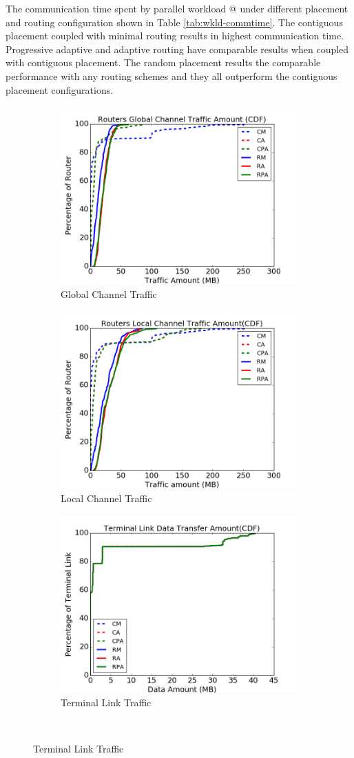 \documentclass[conference,compsoc]{IEEEtran}
\makeatletter
\newcommand{\Rmnum}[1]{\expandafter\@slowromancap\romannumeral #1@}
\makeatother
\begin{document}
The communication time spent by parallel workload \Rmnum{1} under different placement and routing configuration shown in Table \ref{tab:wkld-commtime}. The contiguous placement coupled with minimal routing results in highest communication time. Progressive adaptive and adaptive routing have comparable results when coupled with contiguous placement. The random placement results the comparable performance with any routing schemes and they all outperform the contiguous placement configurations.




\begin{figure}[t!]
    \centering
    \begin{subfigure}[t]{0.32\textwidth}
        \centering
        \includegraphics[height=1.8 in]{wkld/gc-traffic}
        \caption{Global Channel Traffic}
        \label{fig:global-channel-traffic}
    \end{subfigure}\hfill
    \hspace{1em}%
    \begin{subfigure}[t]{0.32\textwidth}
        \centering
        \includegraphics[height=1.8 in]{wkld/lc-traffic}
        \caption{Local Channel Traffic}
        \label{fig:local-channel-traffic}
    \end{subfigure}\hfill
    \hspace{1em}%
    \begin{subfigure}[t]{0.32\textwidth}
        \centering
        \includegraphics[height=1.8 in]{wkld/tl-traffic}
        \caption{Terminal Link Traffic}
        \label{fig:terminal-link-traffic}
    \end{subfigure}\\


\end{figure}
\end{document}
